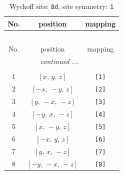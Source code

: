 \documentclass[fleqn,8pt]{jsarticle}
\begin{document}
\begin{longtable}{ccc}
\caption{Wyckoff site: {\tt 8d}, site symmetry: {\tt 1}}
 \\
 \hline \hline
No. & position & mapping \\ \hline \endfirsthead

\multicolumn{2}{l}{\tablename\ \thetable{}} \\
 \hline \hline
No. & position & mapping \\ \hline \endhead

 \hline \hline
\multicolumn{2}{r}{\footnotesize\it continued ...} \\ \endfoot

 \hline \hline
\multicolumn{2}{r}{} \\ \endlastfoot

1 & $\left[ x,\, y,\, z \right]$ & {\tt [1]} \\ \hline
2 & $\left[ - x,\, - y,\, z \right]$ & {\tt [2]} \\ \hline
3 & $\left[ y,\, - x,\, - z \right]$ & {\tt [3]} \\ \hline
4 & $\left[ - y,\, x,\, - z \right]$ & {\tt [4]} \\ \hline
5 & $\left[ x,\, - y,\, z \right]$ & {\tt [5]} \\ \hline
6 & $\left[ - x,\, y,\, z \right]$ & {\tt [6]} \\ \hline
7 & $\left[ y,\, x,\, - z \right]$ & {\tt [7]} \\ \hline
8 & $\left[ - y,\, - x,\, - z \right]$ & {\tt [8]} \\
\end{longtable}
\end{document}
